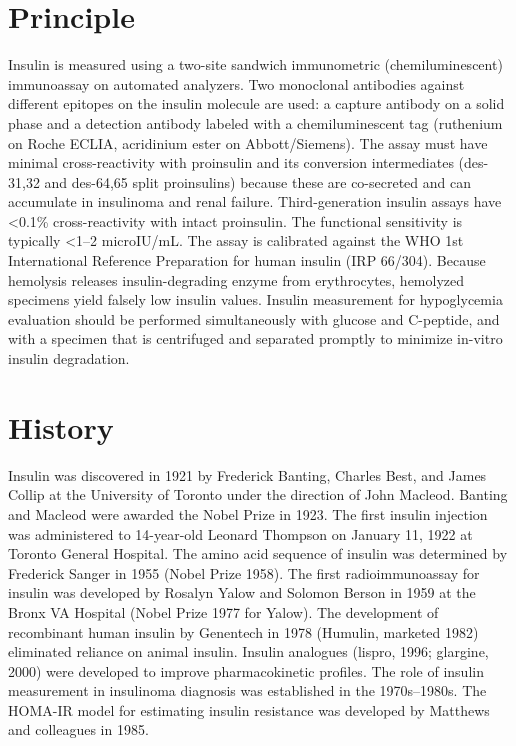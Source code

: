 \section*{Principle}
Insulin is measured using a two-site sandwich immunometric (chemiluminescent) immunoassay on automated analyzers. Two monoclonal antibodies against different epitopes on the insulin molecule are used: a capture antibody on a solid phase and a detection antibody labeled with a chemiluminescent tag (ruthenium on Roche ECLIA, acridinium ester on Abbott/Siemens). The assay must have minimal cross-reactivity with proinsulin and its conversion intermediates (des-31,32 and des-64,65 split proinsulins) because these are co-secreted and can accumulate in insulinoma and renal failure. Third-generation insulin assays have <0.1\% cross-reactivity with intact proinsulin. The functional sensitivity is typically <1--2 microIU/mL. The assay is calibrated against the WHO 1st International Reference Preparation for human insulin (IRP 66/304). Because hemolysis releases insulin-degrading enzyme from erythrocytes, hemolyzed specimens yield falsely low insulin values. Insulin measurement for hypoglycemia evaluation should be performed simultaneously with glucose and C-peptide, and with a specimen that is centrifuged and separated promptly to minimize in-vitro insulin degradation.

\section*{History}
Insulin was discovered in 1921 by Frederick Banting, Charles Best, and James Collip at the University of Toronto under the direction of John Macleod. Banting and Macleod were awarded the Nobel Prize in 1923. The first insulin injection was administered to 14-year-old Leonard Thompson on January 11, 1922 at Toronto General Hospital. The amino acid sequence of insulin was determined by Frederick Sanger in 1955 (Nobel Prize 1958). The first radioimmunoassay for insulin was developed by Rosalyn Yalow and Solomon Berson in 1959 at the Bronx VA Hospital (Nobel Prize 1977 for Yalow). The development of recombinant human insulin by Genentech in 1978 (Humulin, marketed 1982) eliminated reliance on animal insulin. Insulin analogues (lispro, 1996; glargine, 2000) were developed to improve pharmacokinetic profiles. The role of insulin measurement in insulinoma diagnosis was established in the 1970s--1980s. The HOMA-IR model for estimating insulin resistance was developed by Matthews and colleagues in 1985.

